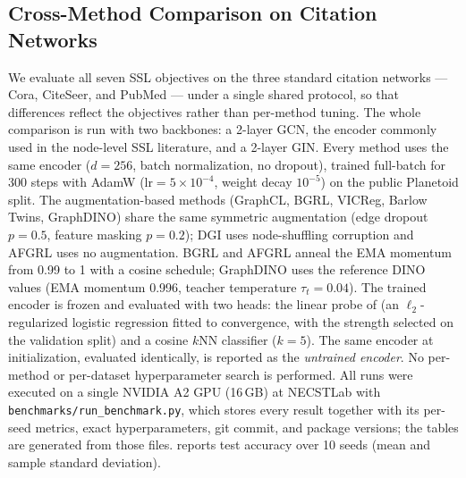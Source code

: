 \documentclass[conference]{IEEEtran}
\begin{document}
\subsection{Cross-Method Comparison on Citation Networks}
\label{sec:results-citation}
We evaluate all seven SSL objectives on the three standard citation networks --- Cora, CiteSeer, and PubMed --- under a single shared protocol, so that differences reflect the objectives rather than per-method tuning. The whole comparison is run with two backbones: a 2-layer GCN, the encoder commonly used in the node-level SSL literature, and a 2-layer GIN. Every method uses the same encoder ($d{=}256$, batch normalization, no dropout), trained full-batch for 300 steps with AdamW ($\text{lr}{=}5{\times}10^{-4}$, weight decay $10^{-5}$) on the public Planetoid split. The augmentation-based methods (GraphCL, BGRL, VICReg, Barlow Twins, GraphDINO) share the same symmetric augmentation (edge dropout $p{=}0.5$, feature masking $p{=}0.2$); DGI uses node-shuffling corruption and AFGRL uses no augmentation. BGRL and AFGRL anneal the EMA momentum from 0.99 to 1 with a cosine schedule; GraphDINO uses the reference DINO values \cite{dino} (EMA momentum 0.996, teacher temperature $\tau_t{=}0.04$). The trained encoder is frozen and evaluated with two heads: the linear probe of  (an $\ell_2$-regularized logistic regression fitted to convergence, with the strength selected on the validation split) and a cosine $k$NN classifier ($k{=}5$). The same encoder at initialization, evaluated identically, is reported as the \textit{untrained encoder}. No per-method or per-dataset hyperparameter search is performed. All runs were executed on a single NVIDIA A2 GPU (16\,GB) at NECSTLab with \texttt{benchmarks/run\_benchmark.py}, which stores every result together with its per-seed metrics, exact hyperparameters, git commit, and package versions; the tables are generated from those files.  reports test accuracy over 10 seeds (mean and sample standard deviation).
\end{document}
